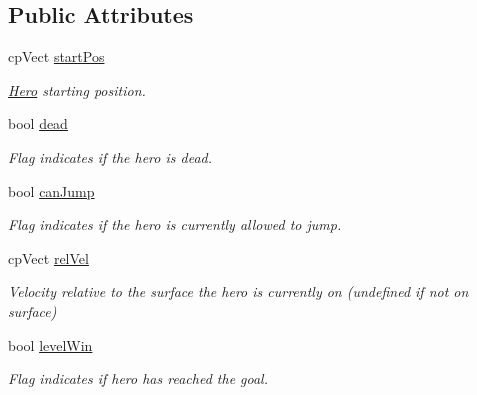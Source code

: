 \subsection*{Public Attributes}
\begin{DoxyCompactItemize}
\item 
cp\+Vect \hyperlink{class_hero_a7a1e815197c299636156836ece73a4c9}{start\+Pos}\hypertarget{class_hero_a7a1e815197c299636156836ece73a4c9}{}\label{class_hero_a7a1e815197c299636156836ece73a4c9}

\begin{DoxyCompactList}\small\item\em \hyperlink{class_hero}{Hero} starting position. \end{DoxyCompactList}\item 
bool \hyperlink{class_hero_a77118f01c205e10585fa6fbd4624a056}{dead}\hypertarget{class_hero_a77118f01c205e10585fa6fbd4624a056}{}\label{class_hero_a77118f01c205e10585fa6fbd4624a056}

\begin{DoxyCompactList}\small\item\em Flag indicates if the hero is dead. \end{DoxyCompactList}\item 
bool \hyperlink{class_hero_a3ba2c1501a4a2ee6ce66ac899ee01a75}{can\+Jump}\hypertarget{class_hero_a3ba2c1501a4a2ee6ce66ac899ee01a75}{}\label{class_hero_a3ba2c1501a4a2ee6ce66ac899ee01a75}

\begin{DoxyCompactList}\small\item\em Flag indicates if the hero is currently allowed to jump. \end{DoxyCompactList}\item 
cp\+Vect \hyperlink{class_hero_aab7d3e7f06a315a9834105ea4b433f93}{rel\+Vel}\hypertarget{class_hero_aab7d3e7f06a315a9834105ea4b433f93}{}\label{class_hero_aab7d3e7f06a315a9834105ea4b433f93}

\begin{DoxyCompactList}\small\item\em Velocity relative to the surface the hero is currently on (undefined if not on surface) \end{DoxyCompactList}\item 
bool \hyperlink{class_hero_ab2a773c753e762df2bc24d582389360b}{level\+Win}\hypertarget{class_hero_ab2a773c753e762df2bc24d582389360b}{}\label{class_hero_ab2a773c753e762df2bc24d582389360b}

\begin{DoxyCompactList}\small\item\em Flag indicates if hero has reached the goal. \end{DoxyCompactList}\end{DoxyCompactItemize}
